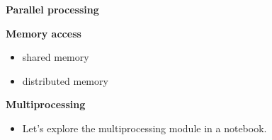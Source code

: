 \begin{frame}\begin{center}
		\LARGE\textbf{Parallel processing}
\end{center}\end{frame}
\begin{frame}\textbf{Memory access}\vspace{0.3cm}

\begin{itemize}\setlength\itemsep{1em}
    \item shared memory
    \item distributed memory
\end{itemize}

\end{frame}
\begin{frame}
  	\begin{figure}[htp]\centering
  	\end{figure}
\end{frame}
\begin{frame}\textbf{Multiprocessing}\vspace{0.3cm}

\begin{itemize}\setlength\itemsep{1em}
    \item Let's explore the multiprocessing module in a notebook.\end{itemize}

\end{frame}
